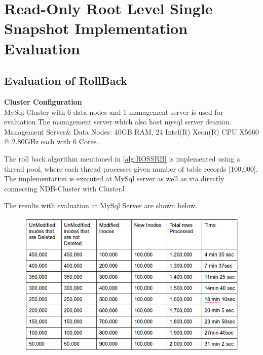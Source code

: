 \section{Read-Only Root Level Single Snapshot Implementation Evaluation}
\subsection{Evaluation of RollBack}
\textbf{Cluster Configuration}\\
MySql Cluster with 6 data nodes and 1 management server is used for evaluation.The management server which also host mysql server deamon.\\
Management Server\& Data Nodes: 40GB RAM, 24 Intel(R) Xeon(R) CPU X5660  @ 2.80GHz each with 6 Cores.

The roll back algorithm mentioned in \ref{alg:ROSSRB} is implemented using a thread pool, where each thread processes given number of table records [100,000]. The implementation is executed at MySql server as well as via directly connecting NDB-Cluster\cite{29} with ClusterJ\cite{clusterj}. 

The results with evaluation at MySql Server are shown below.\\
\begin{figure}
\includegraphics[scale=0.65]{figs/preliminar/MySqlServerSingleSnapshotEval.png}
\label{fig:MySqlServerSSE}%
\end{figure}

\pagebreak

